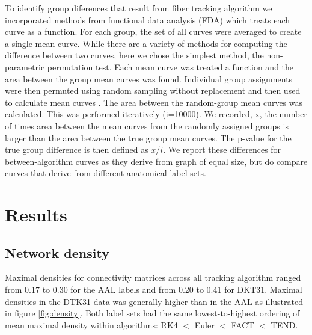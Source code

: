 \documentclass{frontiersSCNS} %
\begin{document}
To identify group diferences that result from fiber tracking algorithm we incorporated methods from functional data analysis (FDA) which treats each curve as a function. For each group, the set of all curves were averaged to create a single mean curve.  While there are a variety of methods for computing the difference between two curves, here we chose the simplest method, the non-parametric permutation test. Each mean curve was treated a function and the area between the group mean curves was found. Individual group assignments were then permuted using random sampling without replacement and then  used to calculate mean curves . The area between the random-group mean curves was calculated. This was performed iteratively (i=10000). We recorded, x, the number of times area between the mean curves from the randomly assigned groups is larger than the area between the true group mean curves. The p-value for the true group difference is then defined as $x/i$. We report these differences for between-algorithm curves as they derive from graph of equal size, but do compare curves that derive from different anatomical label sets.



\section{Results}
\subsection{Network density}
Maximal densities for connectivity matrices across all tracking algorithm ranged from 0.17 to 0.30 for the AAL labels and from 0.20 to 0.41 for DKT31. Maximal densities in the DTK31 data was generally higher than in the AAL as illustrated in figure \ref{fig:density}. Both label sets had the same lowest-to-highest ordering of mean maximal density within algorithms: RK4 $<$ Euler $<$ FACT $<$ TEND.
\end{document}
